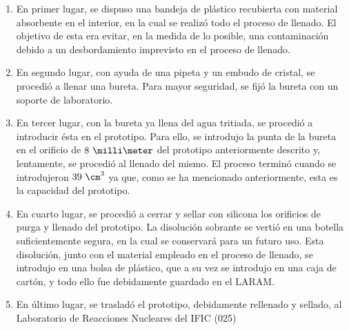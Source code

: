 \begin{enumerate}
\item{} En primer lugar, se dispuso una bandeja de plástico recubierta con material absorbente en el interior, en la cual se realizó todo el proceso de llenado. El objetivo de esta era evitar, en la medida de lo posible, una contaminación debido a un desbordamiento imprevisto en el proceso de llenado. 

\item{} En segundo lugar, con ayuda de una pipeta y un embudo de cristal, se procedió a llenar una bureta. Para mayor seguridad, se fijó la bureta con un soporte de laboratorio. 

\item{} En tercer lugar, con la bureta ya llena del agua tritiada, se procedió a introducir ésta en el prototipo. Para ello, se introdujo la punta  de la bureta en el orificio de $8~\milli\meter$ del prototipo anteriormente descrito y, lentamente, se procedió al llenado del mismo. El proceso terminó cuando se introdujeron $39~\cm^3$ ya que, como se ha mencionado anteriormente, esta es la capacidad del prototipo.

\item{} En cuarto lugar, se procedió a cerrar y sellar con silicona los  orificios de purga y llenado del prototipo. La disolución sobrante se vertió en una botella suficientemente segura, en la cual se conservará para un futuro uso. Esta disolución, junto con el material empleado en el proceso de llenado, se introdujo en una bolsa de plástico, que a su vez  se introdujo en una caja de cartón, y todo ello fue debidamente guardado en el LARAM.

\item{} En último lugar, se trasladó el prototipo, debidamente rellenado y sellado, al Laboratorio de Reacciones Nucleares del IFIC (025)

\end{enumerate}

